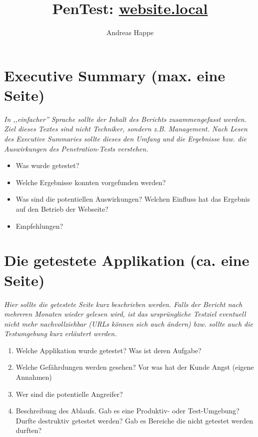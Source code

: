 \documentclass[12pt,a4paper]{report}
\title{PenTest: \url{website.local}}
\author{Andreas Happe}
\date{}
\begin{document}
\maketitle
\tableofcontents
{}

\chapter{Executive Summary (max. eine Seite)}

\textit{In ,,einfacher'' Sprache sollte der Inhalt des Berichts zusammengefasst werden. Ziel dieses Textes sind nicht Techniker, sondern z.B. Management. Nach Lesen des Executive Summaries sollte dieses den Umfang und die Ergebnisse bzw. die Auswirkungen des Penetration-Tests verstehen.}

\begin{itemize}
				\item Was wurde getestet?
				\item Welche Ergebnisse konnten vorgefunden werden?
				\item Was sind die potentiellen Auswirkungen? Welchen Einfluss hat das Ergebnis auf den Betrieb der Webseite?
				\item Empfehlungen?
\end{itemize}

\chapter{Die getestete Applikation (ca. eine Seite)}

\textit{Hier sollte die getestete Seite kurz beschrieben werden. Falls der Bericht nach mehreren Monaten wieder gelesen wird, ist das ursprüngliche Testziel eventuell nicht mehr nachvollziehbar (URLs können sich auch ändern) bzw. sollte auch die Testumgebung kurz erläutert werden.}

\begin{enumerate}
				\item Welche Applikation wurde getestet? Was ist deren Aufgabe?
				\item Welche Gefährdungen werden gesehen? Vor was hat der Kunde Angst (eigene Annahmen)
				\item Wer sind die potentielle Angreifer?
				\item Beschreibung des Ablaufs. Gab es eine Produktiv- oder Test-Umgebung? Durfte destruktiv getestet werden? Gab es Bereiche die nicht getestet werden durften?
\end{enumerate}
\end{document}
